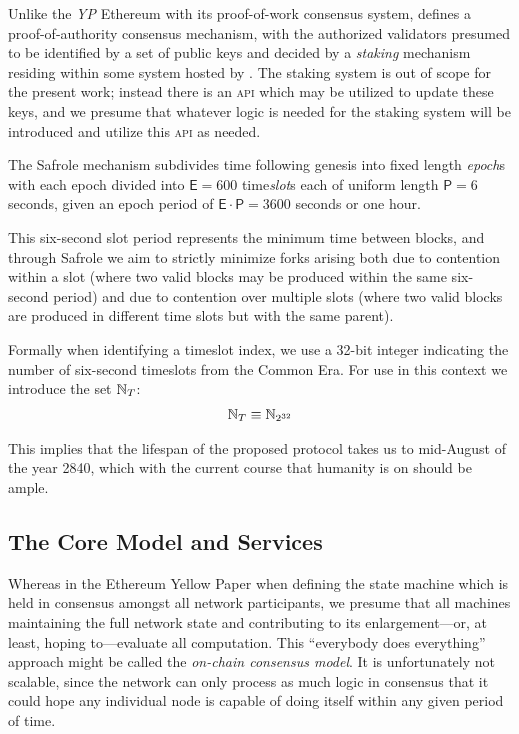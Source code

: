 Unlike the \emph{YP} Ethereum with its proof-of-work consensus system, \Jam defines a proof-of-authority consensus mechanism, with the authorized validators presumed to be identified by a set of public keys and decided by a \emph{staking} mechanism residing within some system hosted by \Jam. The staking system is out of scope for the present work; instead there is an \textsc{api} which may be utilized to update these keys, and we presume that whatever logic is needed for the staking system will be introduced and utilize this \textsc{api} as needed.

The Safrole mechanism subdivides time following genesis into fixed length \emph{epoch}s with each epoch divided into $\mathsf{E} = 600$ time\emph{slot}s each of uniform length $\mathsf{P} = 6$ seconds, given an epoch period of $\mathsf{E}\cdot\mathsf{P} = 3600$ seconds or one hour.

This six-second slot period represents the minimum time between \Jam blocks, and through Safrole we aim to strictly minimize forks arising both due to contention within a slot (where two valid blocks may be produced within the same six-second period) and due to contention over multiple slots (where two valid blocks are produced in different time slots but with the same parent).

Formally when identifying a timeslot index, we use a 32-bit integer indicating the number of six-second timeslots from the \Jam Common Era. For use in this context we introduce the set $\mathbb{N}_T$:
\begin{align}\label{eq:time}
  \mathbb{N}_T \equiv \mathbb{N}_{2^{32}}
\end{align}

This implies that the lifespan of the proposed protocol takes us to mid-August of the year 2840, which with the current course that humanity is on should be ample.

\subsection{The Core Model and Services}\label{sec:coremodelandservices}

Whereas in the Ethereum Yellow Paper when defining the state machine which is held in consensus amongst all network participants, we presume that all machines maintaining the full network state and contributing to its enlargement---or, at least, hoping to---evaluate all computation. This ``everybody does everything'' approach might be called the \emph{on-chain consensus model}. It is unfortunately not scalable, since the network can only process as much logic in consensus that it could hope any individual node is capable of doing itself within any given period of time.

